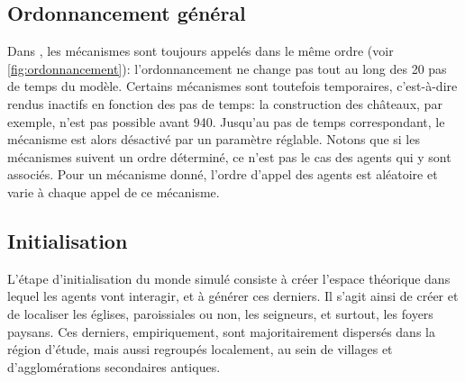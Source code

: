 \subsection*{Ordonnancement général \label{meca-ordonancement}}



\begin{tcolorbox}[breakable,left=0pt,right=0pt,top=0pt,bottom=0pt,
	colback=gray!15,colframe=gray!15,width=\dimexpr\textwidth\relax, 
	enlarge left by=0mm, boxsep=5pt,arc=0pt,outer arc=0pt]
	
Dans \simfeodal{}, les mécanismes sont toujours appelés dans le même ordre (voir \cref{fig:ordonnancement}): l'ordonnancement ne change pas tout au long des 20 pas de temps du modèle.
Certains mécanismes sont toutefois temporaires, c'est-à-dire rendus inactifs en fonction des pas de temps: la construction des châteaux, par exemple, n'est pas possible avant 940.
Jusqu'au pas de temps correspondant, le mécanisme est alors désactivé par un paramètre réglable.
Notons que si les mécanismes suivent un ordre déterminé, ce n'est pas le cas des agents qui y sont associés.
Pour un mécanisme donné, l'ordre d'appel des agents est aléatoire et varie à chaque appel de ce mécanisme.
\end{tcolorbox}


\subsection{Initialisation \label{meca-init}}

L'étape d'initialisation du \og monde\fg{} simulé consiste à créer l'espace théorique dans lequel les agents vont interagir, et à générer ces derniers.
Il s'agit ainsi de créer et de localiser les églises, paroissiales ou non, les seigneurs, et surtout, les foyers paysans.
Ces derniers, empiriquement, sont majoritairement dispersés dans la région d'étude, mais aussi regroupés localement, au sein de villages et d'agglomérations secondaires antiques.

